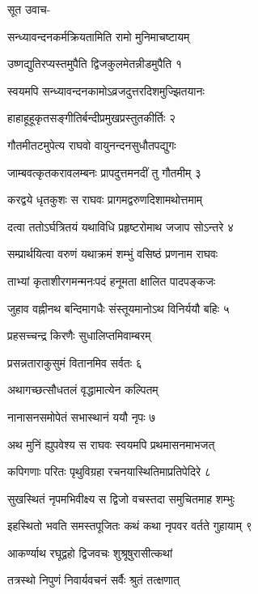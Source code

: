

\storymeta


सूत उवाच-

सन्ध्यावन्दनकर्मक्रियतामिति रामो मुनिमाचष्टायम्

उष्णद्युतिरप्यस्तमुपैति द्विजकुलमेतन्नीडमुपैति १

स्वयमपि सन्ध्यावन्दनकामोऽव्रजदुत्तरदिशमुज्झितयानः

हाहाहूहूकृतसङ्गीतिर्बन्दीप्रमुखप्रस्तुतकीर्तिः २

गौतमीतटमुपेत्य राघवो वायुनन्दनसुधौतपद्युगः

जाम्बवत्कृतकरावलम्बनः प्रापदुत्तमनदीं तु गौतमीम् ३

करद्वये धृतकुशः स राघवः प्रागमद्वरुणदिशामथोत्तमाम्

दत्वा ततोऽर्घत्रितयं यथाविधि प्रहृष्टरोमाथ जजाप सोऽन्तरे ४

सम्प्रार्थयित्वा वरुणं यथाक्रमं शम्भुं वसिष्ठं प्रणनाम राघवः

ताभ्यां कृताशीरगमन्मनःपदं हनूमता क्षालित पादपङ्कजः

जुहाव वह्नीनथ बन्दिमागधैः संस्तूयमानोऽथ विनिर्ययौ बहिः ५

प्रहसच्चन्द्र किरणैः सुधालिप्तमिवाम्बरम्

प्रसन्नताराकुसुमं वितानमिव सर्वतः ६

अथागच्छत्सौधतलं वृद्धामात्येन कल्पितम्

नानासनसमोपेतं सभास्थानं ययौ नृपः ७

अथ मुनिं ह्युपवेश्य स राघवः स्वयमपि प्रथमासनमाभजत्

कपिगणाः परितः पृथुविग्रहा रचनयास्थितिमाप्रतिपेदिरे ८

सुखस्थितं नृपमभिवीक्ष्य स द्विजो वचस्तदा समुचितमाह शम्भुः

इहस्थितो भवति समस्तपूजितः कथं कथा नृपवर वर्तते गुहायाम् ९

आकर्ण्याथ रघूद्वहो द्विजवचः शुश्रूषुरासीत्कथां

तत्रस्थो निपुणं निवार्यवचनं सर्वैः श्रुतं तत्क्षणात्

